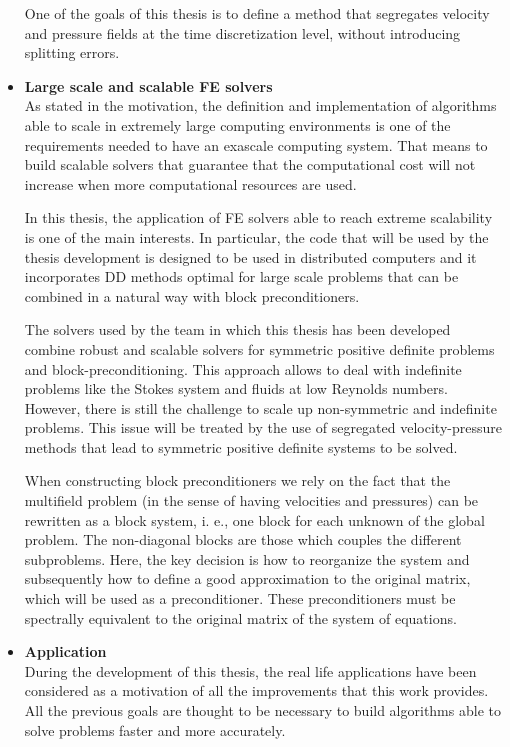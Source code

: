 \begin{itemize}
One of the goals of this thesis is to define a method that segregates velocity and pressure fields at the time discretization level, without introducing splitting errors.

\item {\bf Large scale and scalable FE solvers}\\
As stated in the motivation, the definition and implementation of algorithms able to scale in extremely large computing environments is one of the requirements needed to have an exascale computing system. That means to build scalable solvers that guarantee that the computational cost will not increase when more computational resources are used.

In this thesis, the application of FE solvers able to reach extreme scalability is one of the main interests. In particular, the code that will be used by the thesis development is designed to be used in distributed computers and it incorporates DD methods optimal for large scale problems that can be combined in a natural way with block preconditioners.

The solvers used by the team in which this thesis has been developed combine robust and scalable solvers for symmetric positive definite problems and block-preconditioning. This approach allows to deal with indefinite problems like the Stokes system and fluids at low Reynolds numbers. However, there is still the challenge to scale up non-symmetric and indefinite problems. This issue will be treated by the use of segregated velocity-pressure methods that lead to symmetric positive definite systems to be solved.

When constructing block preconditioners we rely on the fact that the multifield problem (in the sense of having velocities and pressures) can be rewritten as a block system, i. e., one block for each unknown of the global problem. The non-diagonal blocks are those which couples the different subproblems. Here, the key decision is how to reorganize the system and subsequently how to define a good approximation to the original matrix, which will be used as a preconditioner. These preconditioners must be spectrally equivalent to the original matrix of the system of equations.

\item {\bf Application}\\
During the development of this thesis, the real life applications have been considered as a motivation of all the improvements that this work provides. All the previous goals are thought to be necessary to build algorithms able to solve problems faster and more accurately.


\end{itemize}
